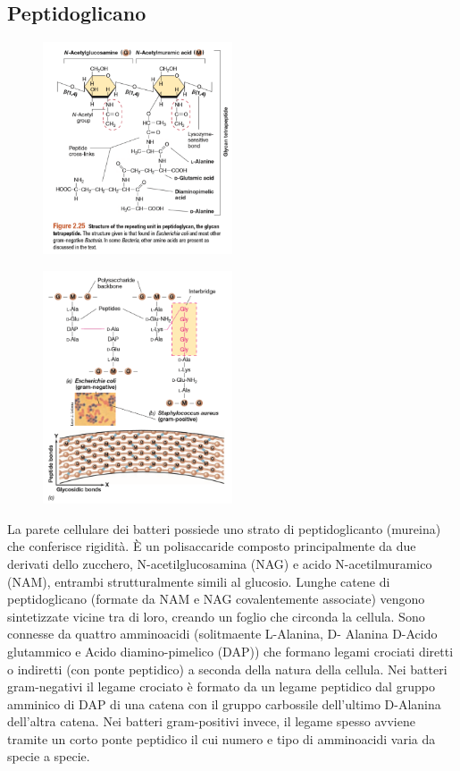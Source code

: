 \subsection{Peptidoglicano}
\begin{multicols}{2}
\begin{figure}[H]
	\includegraphics[width=0.5\textwidth]{Pictures/Peptidoglicano.png}
\end{figure}    
\columnbreak
\begin{figure}[H]
	\includegraphics[width=0.5\textwidth]{Pictures/Peptidoglicano2.png}
\end{figure}       
\end{multicols}
La parete cellulare dei batteri possiede uno strato di peptidoglicanto (mureina) che conferisce rigidit\`a. \`E
un polisaccaride composto principalmente da due derivati dello zucchero, N-acetilglucosamina (NAG) e acido N-acetilmuramico (NAM), entrambi strutturalmente 
simili al glucosio. Lunghe catene di peptidoglicano (formate da NAM e NAG covalentemente associate) vengono sintetizzate vicine tra di loro, creando un 
foglio che circonda la cellula. Sono connesse da quattro amminoacidi (solitmaente L-Alanina, D- Alanina D-Acido glutammico e Acido diamino-pimelico (DAP)) che formano legami crociati 
diretti o indiretti (con ponte peptidico) a seconda della natura della cellula. Nei batteri gram-negativi il legame crociato è formato da un legame peptidico dal gruppo amminico di DAP di una 
catena con il gruppo carbossile dell’ultimo D-Alanina dell’altra catena. Nei batteri gram-positivi invece, il legame spesso avviene tramite un corto ponte 
peptidico il cui numero e tipo di amminoacidi varia da specie a specie. 
